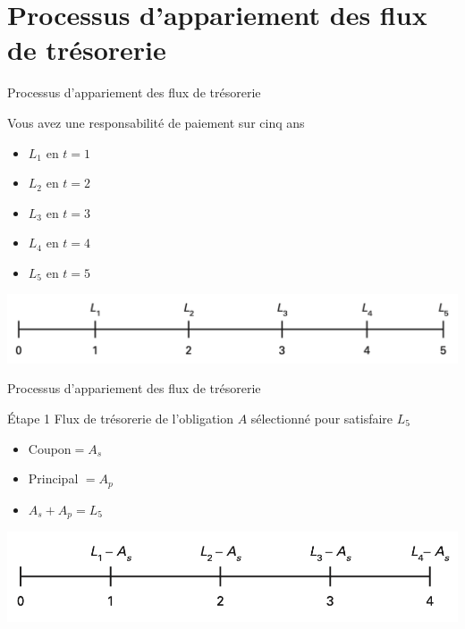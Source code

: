 \documentclass[10pt,a4paper]{beamer}
\begin{document}
\section{Processus d'appariement des flux de trésorerie}

\begin{frame}{Processus d'appariement des flux de trésorerie}
\begin{block}{Vous avez une responsabilité de paiement sur cinq ans}
\begin{itemize}[label=\bullet]
\item $L_1$ en $t=1$
\item $L_2$ en $t=2$
\item $L_3$ en $t=3$
\item $L_4$ en $t=4$ 
\item $L_5$ en $t=5$
\end{itemize}
\end{block}
\includegraphics[scale=.5]{1}
\end{frame}

\begin{frame}{Processus d'appariement des flux de trésorerie}
\begin{block}{Étape 1}
Flux de trésorerie de l'obligation $A$ sélectionné pour satisfaire $L_5$
\begin{itemize}[label=\bullet]
\item Coupon$=A_s$ 
\item Principal $=A_p$
\item $A_s+A_p=L_5$
\end{itemize}
\end{block}
\includegraphics[scale=.5]{2}
\end{frame}
\end{document}
